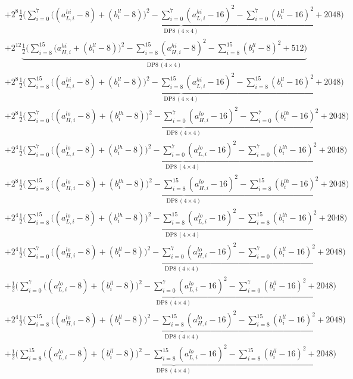 \documentclass[fleqn]{article}
\newcommand{\DPop}[3]{\mathrm{DP#1}\,(#2\!\times\!#3)}
\begin{document}
{\begin{align*}
  & + 2^{8}\underbrace{\tfrac12\Big(\sum_{i=0}^{7}\big((a_{L,i}^{hi}{-}8){+}(b_i^{ll}{-}8)\big)^2 - \sum_{i=0}^{7}(a_{L,i}^{hi}{-}16)^2 - \sum_{i=0}^{7}(b_i^{ll}{-}16)^2 + 2048\Big)}_{\DPop{8}{4}{4}} \\[0.25em]
  & + 2^{12}\underbrace{\tfrac12\Big(\sum_{i=8}^{15}\big(a_{H,i}^{hi}{+}(b_i^{ll}{-}8)\big)^2 - \sum_{i=8}^{15}(a_{H,i}^{hi}{-}8)^2 - \sum_{i=8}^{15}(b_i^{ll}{-}8)^2 + 512\Big)}_{\DPop{8}{4}{4}} \\[0.25em]
  & + 2^{8}\underbrace{\tfrac12\Big(\sum_{i=8}^{15}\big((a_{L,i}^{hi}{-}8){+}(b_i^{ll}{-}8)\big)^2 - \sum_{i=8}^{15}(a_{L,i}^{hi}{-}16)^2 - \sum_{i=8}^{15}(b_i^{ll}{-}16)^2 + 2048\Big)}_{\DPop{8}{4}{4}} \\[0.25em]
  & + 2^{8}\underbrace{\tfrac12\Big(\sum_{i=0}^{7}\big((a_{H,i}^{lo}{-}8){+}(b_i^{lh}{-}8)\big)^2 - \sum_{i=0}^{7}(a_{H,i}^{lo}{-}16)^2 - \sum_{i=0}^{7}(b_i^{lh}{-}16)^2 + 2048\Big)}_{\DPop{8}{4}{4}} \\[0.25em]
  & + 2^{4}\underbrace{\tfrac12\Big(\sum_{i=0}^{7}\big((a_{L,i}^{lo}{-}8){+}(b_i^{lh}{-}8)\big)^2 - \sum_{i=0}^{7}(a_{L,i}^{lo}{-}16)^2 - \sum_{i=0}^{7}(b_i^{lh}{-}16)^2 + 2048\Big)}_{\DPop{8}{4}{4}} \\[0.25em]
  & + 2^{8}\underbrace{\tfrac12\Big(\sum_{i=8}^{15}\big((a_{H,i}^{lo}{-}8){+}(b_i^{lh}{-}8)\big)^2 - \sum_{i=8}^{15}(a_{H,i}^{lo}{-}16)^2 - \sum_{i=8}^{15}(b_i^{lh}{-}16)^2 + 2048\Big)}_{\DPop{8}{4}{4}} \\[0.25em]
  & + 2^{4}\underbrace{\tfrac12\Big(\sum_{i=8}^{15}\big((a_{L,i}^{lo}{-}8){+}(b_i^{lh}{-}8)\big)^2 - \sum_{i=8}^{15}(a_{L,i}^{lo}{-}16)^2 - \sum_{i=8}^{15}(b_i^{lh}{-}16)^2 + 2048\Big)}_{\DPop{8}{4}{4}} \\[0.25em]
  & + 2^{4}\underbrace{\tfrac12\Big(\sum_{i=0}^{7}\big((a_{H,i}^{lo}{-}8){+}(b_i^{ll}{-}8)\big)^2 - \sum_{i=0}^{7}(a_{H,i}^{lo}{-}16)^2 - \sum_{i=0}^{7}(b_i^{ll}{-}16)^2 + 2048\Big)}_{\DPop{8}{4}{4}} \\[0.25em]
  & + \underbrace{\tfrac12\Big(\sum_{i=0}^{7}\big((a_{L,i}^{lo}{-}8){+}(b_i^{ll}{-}8)\big)^2 - \sum_{i=0}^{7}(a_{L,i}^{lo}{-}16)^2 - \sum_{i=0}^{7}(b_i^{ll}{-}16)^2 + 2048\Big)}_{\DPop{8}{4}{4}} \\[0.25em]
  & + 2^{4}\underbrace{\tfrac12\Big(\sum_{i=8}^{15}\big((a_{H,i}^{lo}{-}8){+}(b_i^{ll}{-}8)\big)^2 - \sum_{i=8}^{15}(a_{H,i}^{lo}{-}16)^2 - \sum_{i=8}^{15}(b_i^{ll}{-}16)^2 + 2048\Big)}_{\DPop{8}{4}{4}} \\[0.25em]
  & + \underbrace{\tfrac12\Big(\sum_{i=8}^{15}\big((a_{L,i}^{lo}{-}8){+}(b_i^{ll}{-}8)\big)^2 - \sum_{i=8}^{15}(a_{L,i}^{lo}{-}16)^2 - \sum_{i=8}^{15}(b_i^{ll}{-}16)^2 + 2048\Big)}_{\DPop{8}{4}{4}}
\end{align*}
}
\end{document}
